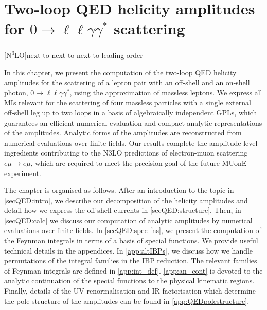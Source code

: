 \documentclass[main.tex]{subfiles}
\begin{document}
\chapter{Two-loop QED helicity amplitudes for $0\to\ell \bar\ell \gamma \gamma^*$ scattering} \label{sec:QEDpaper}
\begin{acronym}
    [N\textsuperscript{3}LO]{next-to-next-to-next-to-leading order}
\end{acronym}

In this chapter, we present the computation of the two-loop QED helicity amplitudes for the scattering of a lepton pair with an off-shell and an on-shell photon, $0\to\ell \bar\ell \gamma \gamma^*$, using the approximation of massless leptons. We express all MIs relevant for the scattering of four massless particles with a single external off-shell leg up to two loops in a basis of algebraically independent GPLs, which guarantees an efficient numerical evaluation and compact analytic representations of the amplitudes. Analytic forms of the amplitudes are reconstructed from numerical evaluations over finite fields. Our results complete the amplitude-level ingredients contributing to the \acs{N3LO} predictions of electron-muon scattering $e\mu\to e\mu$, which are required to meet the precision goal of the future MUonE experiment.

The chapter is organised as follows. After an introduction to the topic in \cref{secQED:intro}, we describe our decomposition of the helicity amplitudes and detail how we express the off-shell currents in \cref{secQED:structure}. Then, in \cref{secQED:calc} we discuss our computation of analytic amplitudes by numerical evaluations over finite fields. In \cref{secQED:spec-fns}, we present the computation of the Feynman integrals in terms of a basis of special functions. We provide useful technical details in the appendices. In \cref{app:altIBPs}, we discuss how we handle permutations of the integral families in the IBP reduction. The relevant families of Feynman integrals are defined in \cref{app:int_def}. \cref{app:an_cont} is devoted to the analytic continuation of the special functions to the physical kinematic regions. Finally, details of the UV renormalisation and IR factorisation which determine the pole structure of the amplitudes can be found in  \cref{app:QEDpolestructure}.
\end{document}
